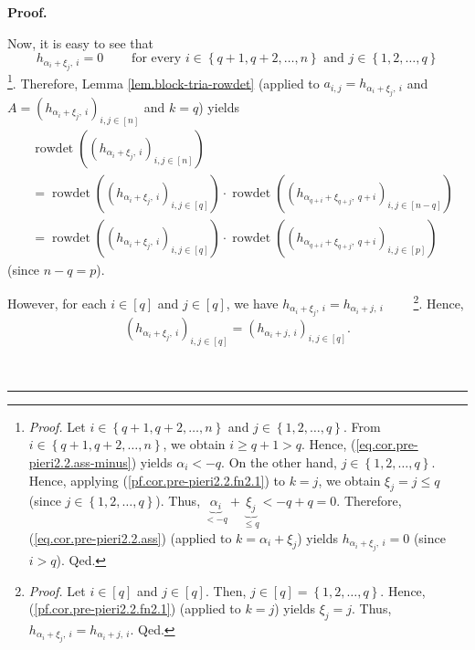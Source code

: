 \documentclass[numbers=enddot,12pt,final,onecolumn,notitlepage,english]{scrartcl}%
\theoremstyle{definition}
\newenvironment{proof}[1][Proof]{\noindent\textbf{#1.} }{\ \rule{0.5em}{0.5em}}
\newenvironment{verlong}{}{}
\newenvironment{vershort}{}{}
\begin{document}
\begin{proof}
\begin{vershort}
\end{vershort}

\begin{verlong}
Now, it is easy to see that
\[
h_{\alpha_{i}+\xi_{j},\ i}=0\ \ \ \ \ \ \ \ \ \ \text{for every }i\in\left\{
q+1,q+2,\ldots,n\right\}  \text{ and }j\in\left\{  1,2,\ldots,q\right\}
\]
\footnote{\textit{Proof.} Let $i\in\left\{  q+1,q+2,\ldots,n\right\}  $ and
$j\in\left\{  1,2,\ldots,q\right\}  $. From $i\in\left\{  q+1,q+2,\ldots
,n\right\}  $, we obtain $i\geq q+1>q$. Hence,
(\ref{eq.cor.pre-pieri2.2.ass-minus}) yields $\alpha_{i}<-q$. On the other
hand, $j\in\left\{  1,2,\ldots,q\right\}  $. Hence, applying
(\ref{pf.cor.pre-pieri2.2.fn2.1}) to $k=j$, we obtain $\xi_{j}=j\leq q$ (since
$j\in\left\{  1,2,\ldots,q\right\}  $). Thus, $\underbrace{\alpha_{i}}%
_{<-q}+\underbrace{\xi_{j}}_{\leq q}<-q+q=0$. Therefore,
(\ref{eq.cor.pre-pieri2.2.ass}) (applied to $k=\alpha_{i}+\xi_{j}$) yields
$h_{\alpha_{i}+\xi_{j},\ i}=0$ (since $i>q$). Qed.}. Therefore, Lemma
\ref{lem.block-tria-rowdet} (applied to $a_{i,j}=h_{\alpha_{i}+\xi_{j},\ i}$
and $A=\left(  h_{\alpha_{i}+\xi_{j},\ i}\right)  _{i,j\in\left[  n\right]  }$
and $k=q$) yields%
\begin{align}
&  \operatorname*{rowdet}\left(  \left(  h_{\alpha_{i}+\xi_{j},\ i}\right)
_{i,j\in\left[  n\right]  }\right) \nonumber\\
&  =\operatorname*{rowdet}\left(  \left(  h_{\alpha_{i}+\xi_{j},\ i}\right)
_{i,j\in\left[  q\right]  }\right)  \cdot\operatorname*{rowdet}\left(  \left(
h_{\alpha_{q+i}+\xi_{q+j},\ q+i}\right)  _{i,j\in\left[  n-q\right]  }\right)
\nonumber\\
&  =\operatorname*{rowdet}\left(  \left(  h_{\alpha_{i}+\xi_{j},\ i}\right)
_{i,j\in\left[  q\right]  }\right)  \cdot\operatorname*{rowdet}\left(  \left(
h_{\alpha_{q+i}+\xi_{q+j},\ q+i}\right)  _{i,j\in\left[  p\right]  }\right)
\label{pf.cor.pre-pieri2.2.3}%
\end{align}
(since $n-q=p$).

However, for each $i\in\left[  q\right]  $ and $j\in\left[  q\right]  $, we
have $h_{\alpha_{i}+\xi_{j},\ i}=h_{\alpha_{i}+j,\ i}$%
\ \ \ \ \footnote{\textit{Proof.} Let $i\in\left[  q\right]  $ and
$j\in\left[  q\right]  $. Then, $j\in\left[  q\right]  =\left\{
1,2,\ldots,q\right\}  $. Hence, (\ref{pf.cor.pre-pieri2.2.fn2.1}) (applied to
$k=j$) yields $\xi_{j}=j$. Thus, $h_{\alpha_{i}+\xi_{j},\ i}=h_{\alpha
_{i}+j,\ i}$. Qed.}. Hence,
\begin{equation}
\left(  h_{\alpha_{i}+\xi_{j},\ i}\right)  _{i,j\in\left[  q\right]  }=\left(
h_{\alpha_{i}+j,\ i}\right)  _{i,j\in\left[  q\right]  }.
\label{pf.cor.pre-pieri2.2.4}%
\end{equation}



\end{verlong}
\end{proof}
\end{document}
